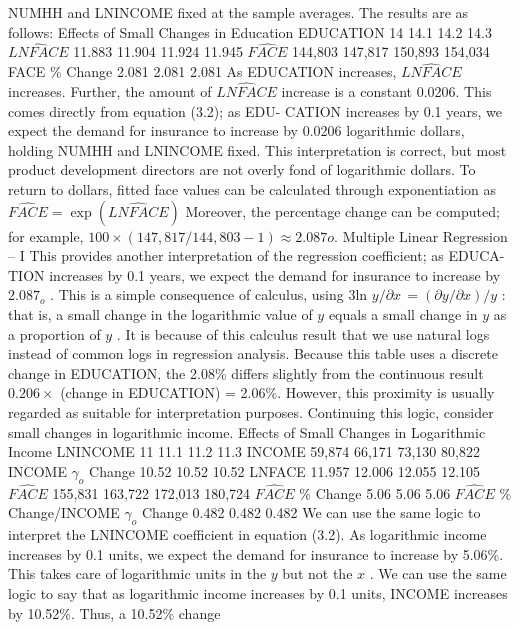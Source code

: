 \documentclass[11pt]{article}
\begin{document}
NUMHH and LNINCOME fixed at the sample averages. The results are as
follows:
Effects of Small Changes in Education
EDUCATION 14 14.1 14.2 14.3
\(\widehat{L N F A C E}\) 11.883 11.904 11.924 11.945
\(\widehat{F A C E}\) 144,803 147,817 150,893 154,034
FACE \% Change 2.081 2.081 2.081
 As EDUCATION increases, \(\widehat{L N F A C E}\) increases. Further, the amount of \(\widehat{L N F A C E}\)
increase is a constant 0.0206. This comes directly from equation (3.2); as EDU-
CATION increases by 0.1 years, we expect the demand for insurance to increase
by 0.0206 logarithmic dollars, holding NUMHH and LNINCOME fixed. This
interpretation is correct, but most product development directors are not overly
 fond of logarithmic dollars. To return to dollars, fitted face values can be calculated
through exponentiation as \(\widehat{F A C E}=\operatorname{e x p} ( \widehat{L N F A C E} )\) Moreover, the percentage
change can be computed; for example, \(1 0 0 \times( 1 4 7 , 8 1 7 / 1 4 4 , 8 0 3-1 ) \approx2 . 0 8 7 o .\)
 Multiple Linear Regression -- I
This provides another interpretation of the regression coefficient; as EDUCA-
TION increases by 0.1 years, we expect the demand for insurance to increase by
\(2 . 0 8 7_{o}\) . This is a simple consequence of calculus, using 3ln \(y / \partial x \,=\left( \partial y / \partial x \right) / y\) :
that is, a small change in the logarithmic value of \(y\) equals a small change in \(y\)
 as a proportion of \(y\) . It is because of this calculus result that we use natural logs
 instead of common logs in regression analysis. Because this table uses a discrete
change in EDUCATION, the 2.08\% differs slightly from the continuous result
\(0 . 2 0 6 \times\) (change in EDUCATION) = 2.06\%. However, this proximity is usually
regarded as suitable for interpretation purposes.
Continuing this logic, consider small changes in logarithmic income.
Effects of Small Changes in Logarithmic Income
LNINCOME 11 11.1 11.2 11.3
INCOME 59,874 66,171 73,130 80,822
INCOME \(\gamma_{o}\) Change 10.52 10.52 10.52
LNFACE 11.957 12.006 12.055 12.105
\(\widehat{F A C E}\) 155,831 163,722 172,013 180,724
\(\widehat{F A C E}\) \% Change 5.06 5.06 5.06
\(\widehat{F A C E}\) \% Change/INCOME \(\gamma_{o}\) Change 0.482 0.482 0.482
We can use the same logic to interpret the LNINCOME coefficient in equation
(3.2). As logarithmic income increases by 0.1 units, we expect the demand for
insurance to increase by 5.06\%. This takes care of logarithmic units in the \(y\)
but not the \(x\) . We can use the same logic to say that as logarithmic income
increases by 0.1 units, INCOME increases by 10.52\%. Thus, a 10.52\% change
\end{document}
